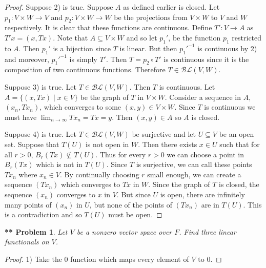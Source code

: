 \documentclass{article}
\newtheorem{**}{** Problem}
\begin{document}
\begin{flushleft}
\begin{proof}
Suppose 2) is true. Suppose $A$ as defined earlier is closed. Let $p_1 : V \times W \rightarrow V$ and $p_2 : V \times W \rightarrow W$ be the projections from $V \times W$ to $V$ and $W$ respectively. It is clear that these functions are continuous. Define $T' : V \rightarrow A$ as $T'x = (x, Tx)$. Note that $A \subseteq V \times W$ and so let $p_1'$, be the function $p_1$ restricted to $A$. Then $p_1'$ is a bijection since $T$ is linear. But then $p_1'^{-1}$ is continuous by 2) and moreover, $p_1'^{-1}$ is simply $T'$. Then $T = p_2 \circ T'$ is continuous since it is the composition of two continuous functions. Therefore $T \in \mathcal{BL} (V, W)$.\newline

Suppose 3) is true. Let $T \in \mathcal{BL} (V, W)$. Then $T$ is continuous. Let $A = \{(x, Tx) \mid x \in V\}$ be the graph of $T$ in $V \times W$. Consider a sequence in $A$, $(x_n, Tx_n)$, which converges to some $(x, y) \in V \times W$. Since $T$ is continuous we must have $\lim_{n \rightarrow \infty} Tx_n = Tx = y$. Then $(x, y) \in A$ so $A$ is closed.\newline

Suppose 4) is true. Let $T \in \mathcal{BL} (V, W)$ be surjective and let $U \subseteq V$ be an open set. Suppose that $T(U)$ is not open in $W$. Then there exists $x \in U$ such that for all $r > 0$, $B_r(Tx) \nsubseteq T(U)$. Thus for every $r > 0$ we can choose a point in $B_r(Tx)$ which is not in $T(U)$. Since $T$ is surjective, we can call these points $Tx_n$ where $x_n \in V$. By continually choosing $r$ small enough, we can create a sequence $(Tx_n)$ which converges to $Tx$ in $W$. Since the graph of $T$ is closed, the sequence $(x_n)$ converges to $x$ in $V$. But since $U$ is open, there are infinitely many points of $(x_n)$ in $U$, but none of the points of $(Tx_n)$ are in $T(U)$. This is a contradiction and so $T(U)$ must be open.
\end{proof}

\begin{**}
Let $V$ be a nonzero vector space over $F$. Find three linear functionals on $V$.
\end{**}
\begin{proof}
1) Take the $0$ function which maps every element of $V$ to $0$.\newline


\end{proof}
\end{flushleft}
\end{document}
